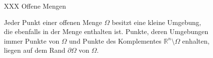 %
%
%
\begin{figure}
\centering
\vspace*{2cm}
XXX Offene Mengen
\vspace*{2cm}
\caption{Jeder Punkt einer offenen Menge $\Omega$ besitzt eine kleine
Umgebung, die ebenfalls in der Menge enthalten ist.
Punkte, deren Umgebungen immer Punkte von $\Omega$ und Punkte des
Komplementes $\mathbb{R}^n\setminus\Omega$ enhalten, liegen auf dem
Rand $\partial\Omega$ von $\Omega$.
\label{buch:felder:fundamentallemma:fig:offen}}
\end{figure}
